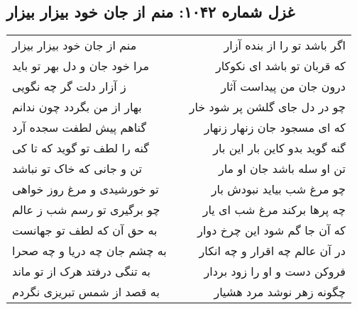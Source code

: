 \begin{center}
\section*{غزل شماره ۱۰۴۲: منم از جان خود بیزار بیزار}
\label{sec:1042}
\begin{longtable}{l p{0.5cm} r}
منم از جان خود بیزار بیزار
&&
اگر باشد تو را از بنده آزار
\\
مرا خود جان و دل بهر تو باید
&&
که قربان تو باشد ای نکوکار
\\
ز آزار دلت گر چه نگویی
&&
درون جان من پیداست آثار
\\
بهار از من بگردد چون ندانم
&&
چو در دل جای گلشن پر شود خار
\\
گناهم پیش لطفت سجده آرد
&&
که ای مسجود جان زنهار زنهار
\\
گنه را لطف تو گوید که تا کی
&&
گنه گوید بدو کاین بار این بار
\\
تن و جانی که خاک تو نباشد
&&
تن او سله باشد جان او مار
\\
تو خورشیدی و مرغ روز خواهی
&&
چو مرغ شب بیاید نبودش بار
\\
چو برگیری تو رسم شب ز عالم
&&
چه پرها برکند مرغ شب ای یار
\\
به حق آن که لطف تو جهانست
&&
که آن جا گم شود این چرخ دوار
\\
به چشم جان چه دریا و چه صحرا
&&
در آن عالم چه اقرار و چه انکار
\\
به تنگی درفتد هرک از تو ماند
&&
فروکن دست و او را زود بردار
\\
به قصد از شمس تبریزی نگردم
&&
چگونه زهر نوشد مرد هشیار
\\
\end{longtable}
\end{center}
